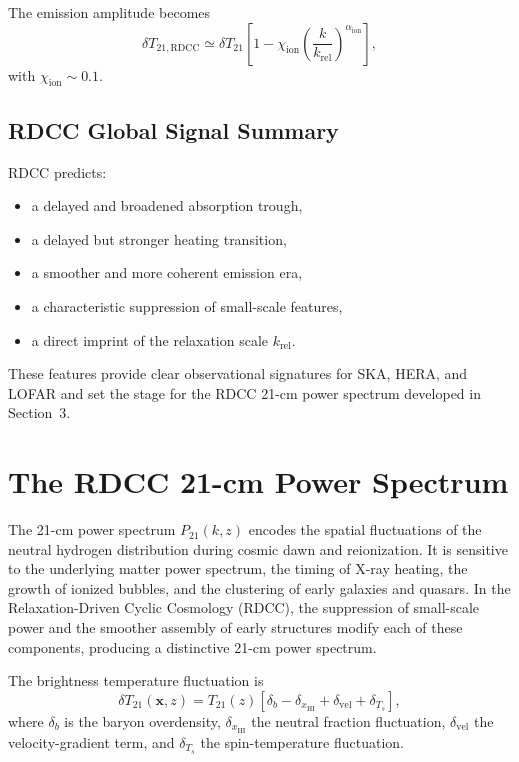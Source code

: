 \documentclass[11pt,a4paper]{article}
\begin{document}
The emission amplitude becomes
\begin{equation}
\delta T_{21,\mathrm{RDCC}}
\simeq
\delta T_{21}
\left[
1
-
\chi_{\mathrm{ion}}
\left(
\frac{k}{k_{\mathrm{rel}}}
\right)^{\alpha_{\mathrm{ion}}}
\right],
\end{equation}
with $\chi_{\mathrm{ion}} \sim 0.1$.

\subsection{RDCC Global Signal Summary}

RDCC predicts:
\begin{itemize}
\item a delayed and broadened absorption trough,
\item a delayed but stronger heating transition,
\item a smoother and more coherent emission era,
\item a characteristic suppression of small-scale features,
\item a direct imprint of the relaxation scale $k_{\mathrm{rel}}$.
\end{itemize}

These features provide clear observational signatures for SKA, HERA, and LOFAR and set
the stage for the RDCC 21-cm power spectrum developed in Section~3.

\section{The RDCC 21-cm Power Spectrum}

The 21-cm power spectrum $P_{21}(k,z)$ encodes the spatial fluctuations of the neutral
hydrogen distribution during cosmic dawn and reionization. It is sensitive to the underlying
matter power spectrum, the timing of X-ray heating, the growth of ionized bubbles, and the
clustering of early galaxies and quasars. In the Relaxation-Driven Cyclic Cosmology (RDCC),
the suppression of small-scale power and the smoother assembly of early structures modify
each of these components, producing a distinctive 21-cm power spectrum.

The brightness temperature fluctuation is
\begin{equation}
\delta T_{21}(\mathbf{x},z)
=
T_{21}(z)
\left[
\delta_{b}
-
\delta_{x_{\mathrm{HI}}}
+
\delta_{\mathrm{vel}}
+
\delta_{T_{s}}
\right],
\end{equation}
where $\delta_{b}$ is the baryon overdensity, $\delta_{x_{\mathrm{HI}}}$ the neutral fraction fluctuation,
$\delta_{\mathrm{vel}}$ the velocity-gradient term, and $\delta_{T_{s}}$ the spin-temperature fluctuation.
\end{document}
